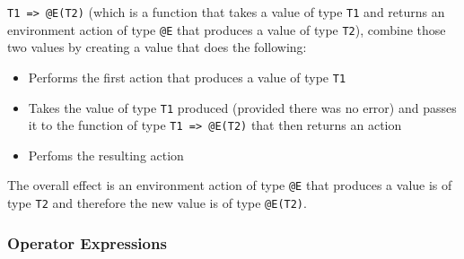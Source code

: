 \documentclass{article}
\begin{document}
\verb|T1 => @E(T2)| (which is a function that takes a value of type
\verb|T1| and returns an environment action of type \verb|@E| that produces
a value of type \verb|T2|), combine those two values by creating a value that
does the following:
\begin{itemize}
\item
Performs the first action that produces a value of type \verb|T1|

\item
Takes the value of type \verb|T1| produced (provided there was no error) and
passes it to the function of type \verb|T1 => @E(T2)| that then returns an
action

\item
Perfoms the resulting action
\end{itemize}
The overall effect is an environment action  of type \verb|@E| that produces
a value is of type \verb|T2| and therefore the new value is of type
\verb|@E(T2)|.

\newpage

\subsubsection{Operator Expressions}
\end{document}
